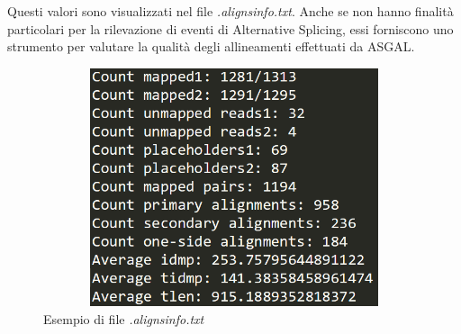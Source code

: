 Questi valori sono visualizzati nel file \textit{.alignsinfo.txt}. Anche se non hanno finalità particolari per la rilevazione di eventi di Alternative Splicing, essi forniscono uno strumento per valutare la qualità degli allineamenti effettuati da ASGAL.

\begin{figure}[h!]
	\centering
	\includegraphics[height=7cm,width=12cm]{images/aligninfo.png}
  \caption{Esempio di file \textit{.alignsinfo.txt}}
  \label{fig:AlternativeSplicingTypes}
\end{figure}